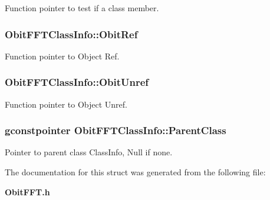 Function pointer to test if a class member. 

\subsubsection{ {\bf Obit\-FFTClass\-Info::Obit\-Ref}}\label{structObitFFTClassInfo_o10}


Function pointer to Object Ref. 

\subsubsection{ {\bf Obit\-FFTClass\-Info::Obit\-Unref}}\label{structObitFFTClassInfo_o11}


Function pointer to Object Unref. 

\subsubsection{\setlength{\rightskip}{0pt plus 5cm}gconstpointer {\bf Obit\-FFTClass\-Info::Parent\-Class}}\label{structObitFFTClassInfo_o3}


Pointer to parent class Class\-Info, Null if none. 



The documentation for this struct was generated from the following file:\begin{CompactItemize}
\item 
{\bf Obit\-FFT.h}\end{CompactItemize}
